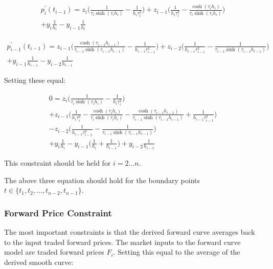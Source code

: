 \documentclass{article}
\begin{document}
\begin{multline}
    p^\prime_i(t_{i-1}) = z_i \biggl( \frac{1}{\tau_i \sinh(\tau_i h_i)} - \frac{1}{h_i \tau_i^2} \biggr) 
        + z_{i-1} \biggl( \frac{1}{h_i \tau_i^2} - \frac{ \cosh(\tau_i h_i)}{\tau_i \sinh(\tau_i h_i)} \biggr)\\
        + y_i \frac{1}{h_i} - y_{i - 1} \frac{1}{h_i}
\end{multline}

\begin{multline}
    p^\prime_{i-1}(t_{i-1}) = z_{i-1} \biggl( \frac{ \cosh(\tau_{i-1} h_{i-1})}{\tau_{i-1} \sinh(\tau_{i-1} h_{i-1})} - \frac{1}{h_{i-1} \tau_{i-1}^2} \biggr) 
        + z_{i-2} \biggl( \frac{1}{h_{i-1} \tau_{i-1}^2} - \frac{1}{\tau_{i-1} \sinh(\tau_{i-1} h_{i-1})} \biggr)\\
        + y_{i-1} \frac{1}{h_{i-1}} - y_{i-2} \frac{1}{h_{i-1}}
\end{multline}

Setting these equal:

\begin{multline}
    0 = z_i \biggl( \frac{1}{\tau_i \sinh(\tau_i h_i)} - \frac{1}{h_i \tau_i^2} \biggr) \\
        + z_{i-1} \biggl( \frac{1}{h_i \tau_i^2} -\frac{ \cosh(\tau_i h_i)}{\tau_i \sinh(\tau_i h_i)}
        - \frac{ \cosh(\tau_{i-1} h_{i-1})}{\tau_{i-1} \sinh(\tau_{i-1} h_{i-1})} + \frac{1}{h_{i-1} \tau_{i-1}^2}\biggr)\\
        - z_{i-2} \biggl( \frac{1}{h_{i-1} \tau_{i-1}^2} - \frac{1}{\tau_{i-1} \sinh(\tau_{i-1} h_{i-1})} \biggr)\\
        + y_i \frac{1}{h_i} - y_{i - 1} \bigl( \frac{1}{h_i} + \frac{1}{h_{i-1}} \bigr)
        + y_{i-2} \frac{1}{h_{i-1}}
\end{multline}

This constraint should be held for $i = 2 \hdots n$.

\bigskip

The above three equation should hold for the boundary points \\
$t \in \{t_1, t_2, \hdots, t_{n-2}, t_{n-1}\}$.

\subsubsection{Forward Price Constraint}
The most important constraints is that the derived forward curve averages back to the 
input traded forward prices.
The market inputs to the forward curve model are traded forward prices $F_i$.
Setting this equal to the average of the derived smooth curve:
\end{document}
